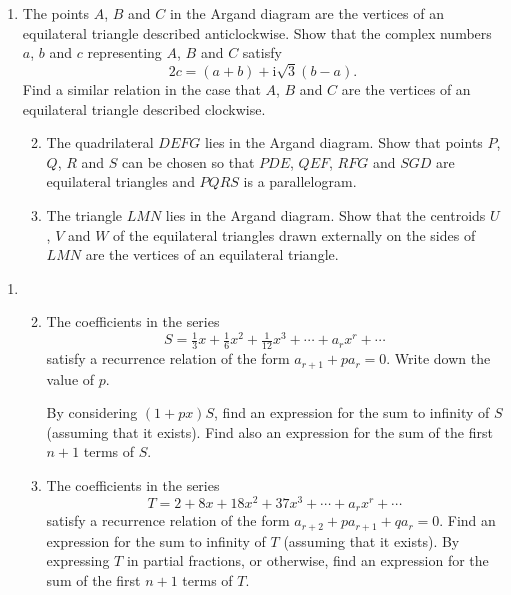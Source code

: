 \documentclass[a4, 11pt]{report}
\newlength{\qspace}
\newcounter{qnumber}
\newenvironment{question}%
 {\vspace{\qspace}
  \begin{enumerate}[\bfseries 1\quad][10]%
    \setcounter{enumi}{\value{qnumber}}%
    \item%
 }
{
  \end{enumerate}
  \filbreak
  \stepcounter{qnumber}
 }
\newenvironment{questionparts}[1][1]%
 {
  \begin{enumerate}[\bfseries (i)]%
    \setcounter{enumii}{#1}
    \addtocounter{enumii}{-1}
    \setlength{\itemsep}{5mm}
    \setlength{\parskip}{8pt}
 }
 {
  \end{enumerate}
 }
\begin{document}
\begin{question}
The  points $A$, $B$ and  $C$ 
 in the Argand diagram are the vertices of an equilateral triangle
 described
anticlockwise. 
Show that the complex numbers
$a$, $b$ and $c$ representing $A$, $B$ and $C$
satisfy  \[2c= (a+b) +\mathrm{i}\sqrt3(b-a).\]
Find a similar relation in the case that
$A$, $B$ and  $C$ 
  are the vertices of an equilateral triangle
 described
clockwise. 

\begin{questionparts}
\item The quadrilateral $DEFG$ lies in the Argand diagram. Show that
points $P$, $Q$, $R$ and $S$ can be chosen so that  
$PDE$, $QEF$, $RFG$ and $SGD$ are equilateral triangles and $PQRS$ is 
a parallelogram.

\item The triangle $LMN$ lies in the Argand diagram.
  Show that the centroids $U$, $V$ and $W$ of the
  equilateral
triangles drawn externally on the sides of  $LMN$ are the vertices
of an equilateral triangle.

\end{questionparts}
\end{question}
		
\begin{question}
\begin{questionparts}
\item
The coefficients in the series
\[
S= \tfrac13 x + \tfrac 16 x^2 + \tfrac1{12} x^3 + \cdots +  a_rx^r +
\cdots
\]
satisfy a recurrence relation of the form $a_{r+1} + p a_r =0$. Write
down the value of $p$.

By considering $(1+px)S$, find an expression for the sum to infinity 
of $S$  (assuming that it exists). Find also
an expression for the sum of the first $n+1$ terms of $S$.

\item
The coefficients in the series 
\[
T=2 + 8x +18x^2+37 x^3 +\cdots + a_rx^r + \cdots
\]
satisfy a recurrence relation of the form $a_{r+2}+pa_{r+1} +qa_r=0$.
Find an expression for the sum to infinity of $T$ (assuming that it
exists). By expressing $T$ in partial fractions, or
otherwise,
find 
an expression for the sum of the first $n+1$ terms of $T$.
\end{questionparts}
\end{question}	
		
\end{document}
